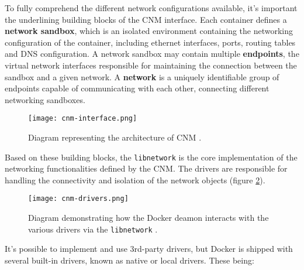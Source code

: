 To fully comprehend the different network configurations available, it's important the underlining building blocks of the \ac{CNM} interface. Each container defines a \textbf{network sandbox}, which is an isolated environment containing the networking configuration of the container, including ethernet interfaces, ports, routing tables and \acs{DNS} configuration. A network sandbox may contain multiple \textbf{endpoints}, the virtual network interfaces responsible for maintaining the connection between the sandbox and a given network. A \textbf{network} is a uniquely identifiable group of endpoints capable of communicating with each other, connecting different networking sandboxes.

\begin{figure}[!htb]
    \centering
    \texttt{[image: cnm-interface.png]}
    \caption{Diagram representing the architecture of \ac{CNM} \cite{fig-src:cnm}.}
    \label{fig:cnm-interface}
\end{figure}

Based on these building blocks, the \texttt{libnetwork} is the core implementation of the networking functionalities defined by the \ac{CNM}. The drivers are responsible for handling the connectivity and isolation of the network objects (figure \ref{fig:cnm-drivers}).

\begin{figure}[!htb]
    \centering
    \texttt{[image: cnm-drivers.png]}
    \caption{Diagram demonstrating how the Docker deamon interacts with the various drivers via the \texttt{libnetwork} \cite{fig-src:cnm}.}
    \label{fig:cnm-drivers}
\end{figure}

It's possible to implement and use 3rd-party drivers, but Docker is shipped with several built-in drivers, known as native or local drivers. These being:

